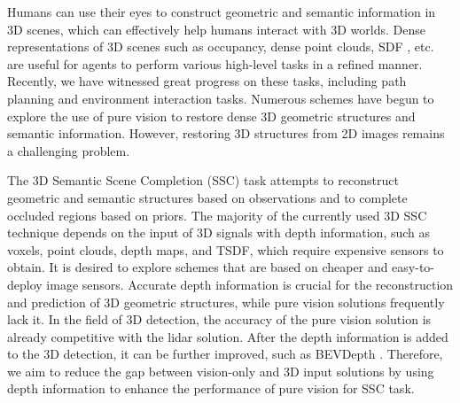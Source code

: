 \documentclass{article}
\begin{document}
Humans can use their eyes to construct geometric and semantic information in 3D scenes, which can effectively help humans interact with 3D worlds. Dense representations of 3D scenes such as occupancy, dense point clouds, SDF \cite{park2019deepsdf}, etc. are useful for agents to perform various high-level tasks in a refined manner. Recently, we have witnessed great progress on these tasks, including path planning and environment interaction tasks. Numerous schemes have begun to explore the use of pure vision to restore dense 3D geometric structures and semantic information. However, restoring 3D structures from 2D images remains a challenging problem. 

	The 3D Semantic Scene Completion (SSC) task \cite{roldao20223d} attempts to reconstruct geometric and semantic structures based on observations and to complete occluded regions based on priors. The majority of the currently used 3D SSC technique depends on the input of 3D signals with depth information, such as voxels, point clouds, depth maps, and TSDF, which require expensive sensors to obtain. It is desired to explore schemes that are based on cheaper and easy-to-deploy image sensors. Accurate depth information is crucial for the reconstruction and prediction of 3D geometric structures, while pure vision solutions frequently lack it. In the field of 3D detection, the accuracy of the pure vision solution is already competitive with the lidar solution. After the depth information is added to the 3D detection, it can be further improved, such as BEVDepth \cite{li2022bevdepth}. Therefore, we aim to reduce the gap between vision-only and 3D input solutions by using depth information to enhance the performance of pure vision for SSC task.
    
\end{document}
